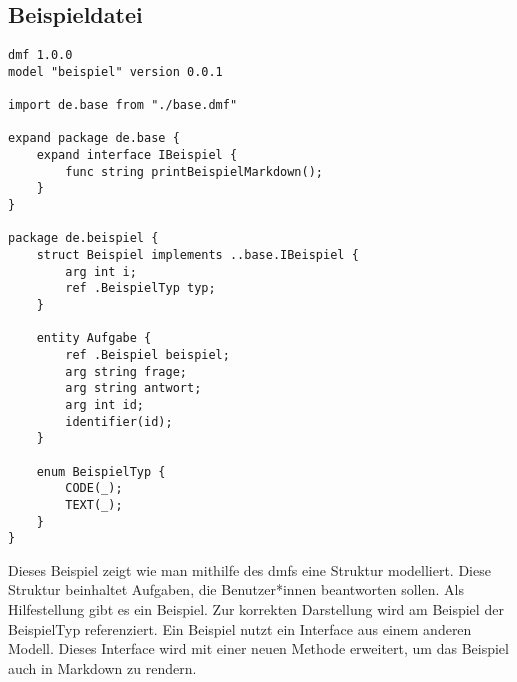 \documentclass[./einleitung.tex]{subfiles}
\begin{document}
\subsection{Beispieldatei}\label{subsec:beispieldatei}
\begin{lstlisting}
dmf 1.0.0
model "beispiel" version 0.0.1

import de.base from "./base.dmf"

expand package de.base {
    expand interface IBeispiel {
        func string printBeispielMarkdown();
    }
}

package de.beispiel {
    struct Beispiel implements ..base.IBeispiel {
        arg int i;
        ref .BeispielTyp typ;
    }
    
    entity Aufgabe {
        ref .Beispiel beispiel;
        arg string frage;
        arg string antwort;
        arg int id;
        identifier(id);
    }
    
    enum BeispielTyp {
        CODE(_);
        TEXT(_);
    }
}
\end{lstlisting}
Dieses Beispiel zeigt wie man mithilfe des \acrshort{dmf}s eine Struktur modelliert.
Diese Struktur beinhaltet Aufgaben, die Benutzer*innen beantworten sollen.
Als Hilfestellung gibt es ein Beispiel.
Zur korrekten Darstellung wird am Beispiel der BeispielTyp referenziert.
Ein Beispiel nutzt ein Interface aus einem anderen Modell.
Dieses Interface wird mit einer neuen Methode erweitert, um das Beispiel auch in Markdown zu rendern.

\end{document}
